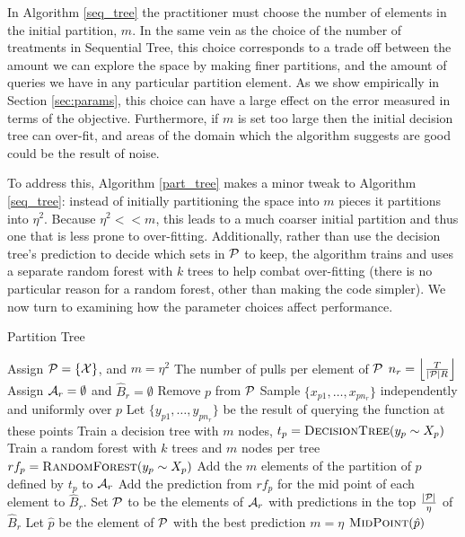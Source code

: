 \documentclass[11pt]{article}
\begin{document}
In Algorithm \ref{seq_tree} the practitioner must choose the number of elements in the initial partition, $m$. In the same vein as the choice of the number of treatments in Sequential Tree, this choice corresponds to a trade off between the amount we can explore the space by making finer partitions, and the amount of queries we have in any particular partition element. As we show empirically in Section \ref{sec:params}, this choice can have a large effect on the error measured in terms of the objective. Furthermore, if $m$ is set too large then the initial decision tree can over-fit, and areas of the domain which the algorithm suggests are good could be the result of noise. 


To address this, Algorithm \ref{part_tree} makes a minor tweak to Algorithm \ref{seq_tree}: instead of initially partitioning the space into $m$ pieces it partitions into $\eta^2$. Because $\eta^2 << m$, this leads to a much coarser initial partition and thus one that is less prone to over-fitting. Additionally, rather than use the decision tree's prediction to decide which sets in $\mathcal{P}$ to keep, the algorithm trains and uses a separate random forest with $k$ trees to help combat over-fitting (there is no particular reason for a random forest, other than making the code simpler). We now turn to examining how the parameter choices affect performance.
\begin{algorithm}
\scriptsize
\caption{Partition Tree}
\label{part_tree}
\begin{algorithmic}[1]
\State Assign $\mathcal{P} = \{\mathcal{X}\}$, and $m = \eta^2$
\State The number of pulls per element of $\mathcal{P}$ $n_r = \left \lfloor \frac{T}{|\mathcal{P}| R} \right \rfloor$
\State Assign $\mathcal{A}_r = \emptyset$ and $\hat{B}_r = \emptyset$
\State Remove $p$ from $\mathcal{P}$
\State Sample $\{x_{p1},\ldots, x_{pn_r}\}$ independently and uniformly over $p$
\State Let $\{y_{p1},\ldots, y_{pn_r}\}$ be the result of querying the function at these points
\State Train a decision tree with $m$ nodes, $t_p = \textproc{DecisionTree}(y_p \sim X_p)$
\State Train a random forest with $k$ trees and $m$ nodes per tree  
\State $rf_p = \textproc{RandomForest}(y_p \sim X_p)$
\State Add the $m$ elements of the partition of $p$ defined by $t_p$ to $\mathcal{A}_r$
\State Add the prediction from $rf_p$ for the mid point of each element to $\hat{B}_r$.
\EndFor
\State Set $\mathcal{P}$ to be the elements of $\mathcal{A}_r$ with predictions in the top $\frac{|\mathcal{P}|}{\eta}$ of $\hat{B}_r$
\State Let $\hat{p}$ be the element of $\mathcal{P}$ with the best prediction
\State $m = \eta$
\EndFor
\State \Return $\textproc{MidPoint}(\hat{p})$
\EndProcedure
\end{algorithmic}
\end{algorithm}
\end{document}
